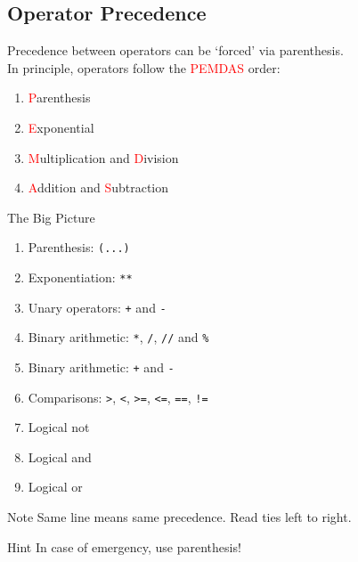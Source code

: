 \documentclass[t,handout,9pt]{beamer}
\begin{document}
\subsection{Operator Precedence}
\begin{frame}
\vfill
Precedence between operators can be `forced' via parenthesis.\\
\vfill
In principle, operators follow the \textcolor{red}{PEMDAS} order:
\begin{enumerate}
	\item \textcolor{red}{P}arenthesis
	\item \textcolor{red}{E}xponential
	\item \textcolor{red}{M}ultiplication and \textcolor{red}{D}ivision
	\item \textcolor{red}{A}ddition and \textcolor{red}{S}ubtraction
\end{enumerate}
\vfill
\end{frame}
%
\begin{frame}
\begin{center}The Big Picture\end{center}
\begin{enumerate}
	\item Parenthesis: \texttt{(...)}
	\item Exponentiation: \texttt{**}
	\item Unary operators: \texttt{+} and \texttt{-}
	\item Binary arithmetic:  \texttt{*}, \texttt{/}, \texttt{//} and \texttt{\%}
	\item Binary arithmetic: \texttt{+} and \texttt{-}
	\item Comparisons: \texttt{>}, \texttt{<}, \texttt{>=}, \texttt{<=}, \texttt{==}, \texttt{!=}
	\item Logical not
	\item Logical and
	\item Logical or
\end{enumerate}
\begin{block}{Note}
Same line means same precedence. Read ties left to right.
\end{block}
\begin{block}{Hint}
In case of emergency, use parenthesis!
\end{block}
\end{frame}
\end{document}
